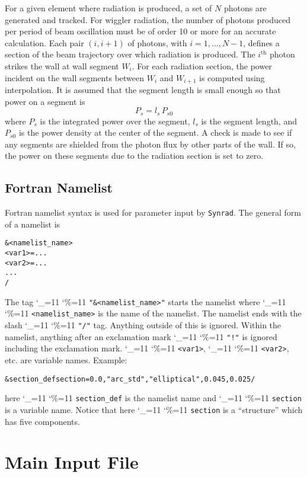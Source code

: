 \documentclass[11pt]{article}
\newcommand{\syn}{\texttt{Synrad}\xspace}
\newcommand\ttcmd{\begingroup\catcode`\_=11 \catcode`\%=11 \dottcmd}
\newcommand\dottcmd[1]{\texttt{#1}\endgroup}
\newcommand{\vn}{\ttcmd}
\newenvironment{example}
  {\vspace{-3.0ex} \begin{alltt}}
  {\end{alltt} \vspace{-2.5ex}}
\begin{document}
For a given element where radiation is produced, a set of $N$ photons
are generated and tracked. For wiggler radiation, the number of
photons produced per period of beam oscillation must be of order 10 or
more for an accurate calculation.  Each pair $(i, i+1)$ of photons, with
$i = 1, \ldots, N-1$, defines a section of the beam trajectory over which
radiation is produced.
The $i^{\mbox{th}}$ photon strikes
the wall at wall segment $W_i$. 
For each radiation section, the power incident on the wall segments between $W_i$
and $W_{i+1}$ is computed using interpolation. It is assumed that the
segment length is small enough so that power on a segment is
\begin{equation}
  P_s = l_s \, P_{s0}
\end{equation}
where $P_s$ is the integrated power over the segment, $l_s$ is the
segment length, and $P_{s0}$ is the power density at the center of the
segment. A check is made to see if any segments are shielded from the
photon flux by other parts of the wall. If so, the power on these
segments due to the radiation section is set to zero.

\subsection{Fortran Namelist}
\label{s:namelist}

Fortran namelist syntax is used for parameter input by \syn. The
general form of a namelist is
\begin{example}
  &<namelist_name>
    <var1> = ...
    <var2> = ...
    ...
  /
\end{example}
The tag \vn{"\&<namelist_name>"} starts the namelist where
\vn{<namelist_name>} is the name of the namelist. The namelist ends
with the slash \vn{"/"} tag. Anything outside of this is
ignored. Within the namelist, anything after an exclamation mark
\vn{"!"} is ignored including the exclamation mark. \vn{<var1>},
\vn{<var2>}, etc. are variable names. Example:
\begin{example}
  &section_def section =   0.0, "arc_std", "elliptical", 0.045, 0.025 /
\end{example}
here \vn{section_def} is the namelist name and \vn{section} is a variable
name.  Notice that here \vn{section} is a ``structure'' which has five
components.

\section{Main Input File} 
\end{document}
